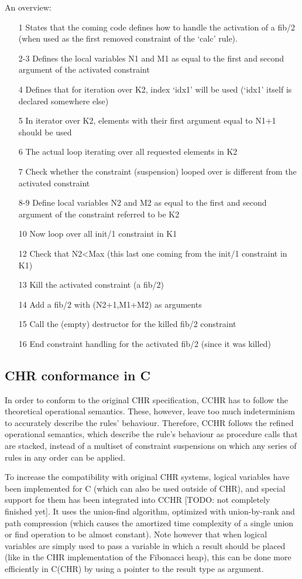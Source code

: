 \documentclass{llncs}
\begin{document}
An overview: \begin{itemize}
  \item[1] States that the coming code defines how to handle the activation of a fib/2 (when used as the first removed constraint of the `calc' rule).
  \item[2-3] Defines the local variables N1 and M1 as equal to the first and second argument of the activated constraint
  \item[4] Defines that for iteration over K2, index `idx1' will be used (`idx1' itself is declared somewhere else)
  \item[5] In iterator over K2, elements with their first argument equal to N1+1 should be used
  \item[6] The actual loop iterating over all requested elements in K2
  \item[7] Check whether the constraint (suspension) looped over is different from the activated constraint
  \item[8-9] Define local variables N2 and M2 as equal to the first and second argument of the constraint referred to be K2
  \item[10] Now loop over all init/1 constraint in K1
  \item[12] Check that N2<Max (this last one coming from the init/1 constraint in K1)
  \item[13] Kill the activated constraint (a fib/2)
  \item[14] Add a fib/2 with (N2+1,M1+M2) as arguments
  \item[15] Call the (empty) destructor for the killed fib/2 constraint
  \item[16] End constraint handling for the activated fib/2 (since it was killed)
\end{itemize}

\subsection{CHR conformance in C}

In order to conform to the original CHR specification, CCHR has to follow the theoretical operational semantics. These,
however, leave too much indeterminism to accurately describe the rules' behaviour. Therefore, CCHR follows the refined
operational semantics, which describe the rule's behaviour as procedure calls that are stacked, instead of a multiset
of constraint suspensions on which any series of rules in any order can be applied.

To increase the compatibility with original CHR systems, logical variables have been implemented for C (which can also be
used outside of CHR), and special support for them has been integrated into CCHR [TODO: not completely finished yet].
It uses the union-find algorithm, optimized with union-by-rank and path compression (which causes the
amortized time complexity of a single union or find operation to be almost constant).
Note however that when logical variables are simply used to pass a variable in which a result should be placed (like in 
the CHR implementation of the Fibonacci heap), this can be done more efficiently in C(CHR) by using a pointer to the result
type as argument.
\end{document}

